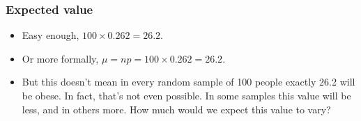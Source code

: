 \documentclass[11pt,containsverbatim,handout]{beamer}
\begin{document}



\begin{frame}
\frametitle{Expected value}


\pause

\begin{itemize}

\item Easy enough, $100 \times 0.262 = 26.2$.

\pause

\item Or more formally, $\mu = np = 100 \times 0.262 = 26.2$.

\pause

\item But this doesn't mean in every random sample of 100 people exactly 26.2 will be obese. In fact, that's not even possible. In some samples this value will be less, and in others more. How much would we expect this value to vary?

\end{itemize}

\end{frame}

\end{document}
